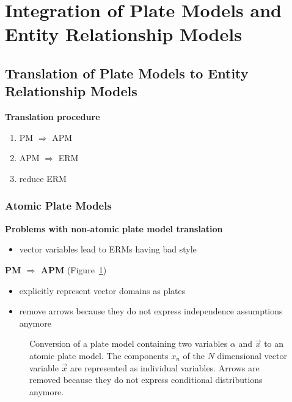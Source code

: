 \section{Integration of Plate Models and Entity Relationship Models}

\subsection{Translation of Plate Models to Entity Relationship Models}

\textbf{Translation procedure}
\begin{enumerate}
\item PM $\Rightarrow$ APM
\item APM $\Rightarrow$ ERM
\item reduce ERM
\end{enumerate}

\subsubsection{Atomic Plate Models}

\textbf{Problems with non-atomic plate model translation}
\begin{itemize}
\item vector variables lead to ERMs having bad style
\end{itemize}

\textbf{PM $\Rightarrow$ APM} (Figure~\ref{fig:pm2apm})
\begin{itemize}
\item explicitly represent vector domains as plates
\item remove arrows because they do not express independence assumptions anymore
\end{itemize}

\begin{figure}
\centering
\scalebox{\tikzScale}{\adjustTikzSize }
\caption{Conversion of a plate model containing two variables $\alpha$ and $\vec x$ to an atomic plate model. The components $x_n$ of the $N$ dimensional vector variable $\vec x$ are represented as individual variables. Arrows are removed because they do not express conditional distributions anymore.}\label{fig:pm2apm}
\end{figure}

